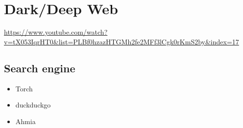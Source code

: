 \chapter{Dark/Deep Web}
\url{https://www.youtube.com/watch?v=tX053IqrHT0&list=PLBf0hzazHTGMh2fe2MFf3lCgk0rKmS2by&index=17}

\section{Search engine}
\begin{itemize}
    \item Torch
    \item duckduckgo
    \item Ahmia
\end{itemize}

